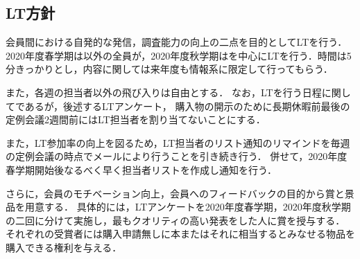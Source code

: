 \subsection*{LT方針}

会員間における自発的な発信，調査能力の向上の二点を目的としてLTを行う．
2020年度春学期は\firstGrade{}以外の全員が，2020年度秋学期は\firstGrade{}を中心にLTを行う．時間は5分きっかりとし，内容に関しては来年度も情報系に限定して行ってもらう．

また，各週の担当者以外の飛び入りは自由とする．
なお，LTを行う日程に関してであるが，後述するLTアンケート，
購入物の開示のために長期休暇前最後の定例会議2週間前にはLT担当者を割り当てないことにする．

また，LT参加率の向上を図るため，LT担当者のリスト通知のリマインドを毎週の定例会議の時点でメールにより行うことを引き続き行う．
併せて，2020年度春学期開始後なるべく早く担当者リストを作成し通知を行う．

さらに，会員のモチベーション向上，会員へのフィードバックの目的から賞と景品を用意する．
具体的には，LTアンケートを2020年度春学期，2020年度秋学期の二回に分けて実施し，最もクオリティの高い発表をした人に賞を授与する．
それぞれの受賞者には購入申請無しに本またはそれに相当するとみなせる物品を購入できる権利を与える．
